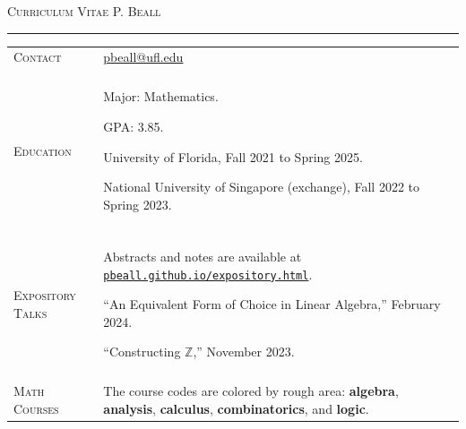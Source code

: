 \documentclass[12pt]{article}
\newcommand\alg{\color{violet}}
\newcommand\comb{\color{orange}}
\newcommand\anal{\color{green}}
\newcommand\calc{\color{teal}}
\newcommand\logic{\color{magenta}}
\newcommand\li{{\color{pink}\ding{117} }}
\begin{document}
\noindent\textsc{Curriculum Vitae \hfill P. Beall} \vspace{0.5em}
\hrule

\noindent\begin{tabularx}{0.97\linewidth}{>{\raggedleft\scshape}p{2.5cm}X}
Contact & \url{pbeall@ufl.edu}
\\&\\
Education & \li Major: Mathematics.

\li GPA: 3.85.

\li University of Florida, Fall 2021 to Spring 2025.

\li National University of Singapore (exchange), Fall 2022 to Spring 2023.
\\&\\
Expository Talks & Abstracts and notes are available at \href{https://pbeall.github.io/expository.html}{\nolinkurl{pbeall.github.io/expository.html}}.

\li ``An Equivalent Form of Choice in Linear Algebra,'' February 2024.

\li ``Constructing $\mathbb{Z}$,'' November 2023.
\\&\\
Math Courses & The course codes are colored by rough area: {\bfseries\alg algebra}, {\bfseries\anal analysis}, {\bfseries\calc calculus}, {\bfseries\comb combinatorics}, and {\bfseries\logic logic}. 


\end{tabularx}
\end{document}
